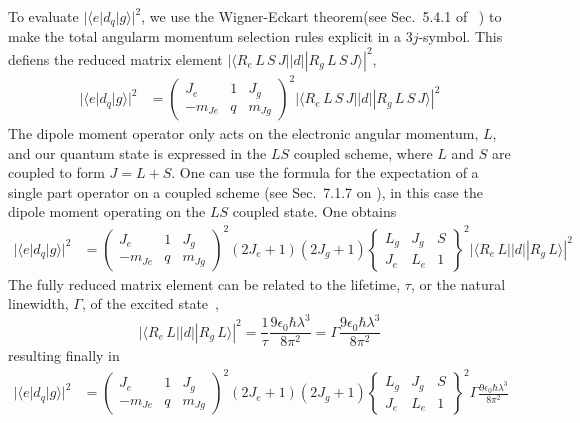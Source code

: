 \documentclass[11pt,letter]{article}
\begin{document}
 
To evaluate $ | \langle e | d_{q} | g \rangle | ^{2} $, we use the
Wigner-Eckart theorem(see Sec.~5.4.1 of ~\cite{edmonds1996angular}) to make the
total angularm momentum selection rules explicit in a 3$j$-symbol.   This
defiens the reduced matrix element $|\langle R_{e}\, L\,S\,J || d || R_{g}\, L\,S\,J \rangle|^{2}$, 
\begin{align}
|\langle e | d_{q} | g \rangle|^{2} & = \begin{pmatrix} J_{e} & 1 & J_{g} \\ -m_{Je} & q & m_{Jg} \end{pmatrix}^{2}
|\langle R_{e}\, L\,S\,J || d || R_{g}\, L\,S\,J \rangle|^{2}
\end{align}
The dipole moment operator only acts on the electronic angular momentum, $L$,
and our quantum state is expressed in the $LS$ coupled scheme, where $L$ and
$S$ are coupled to form $J=L+S$.  One can use the formula for the expectation
of a single part operator on a coupled scheme (see Sec.~7.1.7 on
\cite{edmonds1996angular}), in this case the dipole moment operating on the
$LS$ coupled state. One obtains 
\begin{align}
|\langle e | d_{q} | g \rangle|^{2} & = \begin{pmatrix} J_{e} & 1 & J_{g} \\ -m_{Je} & q & m_{Jg} \end{pmatrix}^{2}
(2J_{e}+1)(2J_{g}+1)  \begin{Bmatrix}L_{g} & J_{g} & S \\ J_{e} & L_{e} & 1 \end{Bmatrix}^{2}|\langle R_{e}\, L || d || R_{g}\, L \rangle|^{2}
\end{align}
The fully reduced matrix element can be related to the lifetime, $\tau$, or the
natural linewidth, $\Gamma$, of the excited state~\cite{Olivares:98}, 
\[
|\langle R_{e}\, L || d || R_{g}\, L \rangle|^{2} = \frac{1}{\tau} \frac{ 9\epsilon_{0} \hbar \lambda^{3}}{8 \pi^{2}} = \Gamma\frac{ 9\epsilon_{0} \hbar \lambda^{3}}{8 \pi^{2}} \]
resulting finally in 
\begin{align}
|\langle e | d_{q} | g \rangle|^{2} & = \begin{pmatrix} J_{e} & 1 & J_{g} \\ -m_{Je} & q & m_{Jg} \end{pmatrix}^{2}
(2J_{e}+1)(2J_{g}+1)  \begin{Bmatrix}L_{g} & J_{g} & S \\ J_{e} & L_{e} & 1 \end{Bmatrix}^{2}\Gamma\frac{ 9\epsilon_{0} \hbar \lambda^{3}}{8 \pi^{2}}
\end{align}
\end{document}
